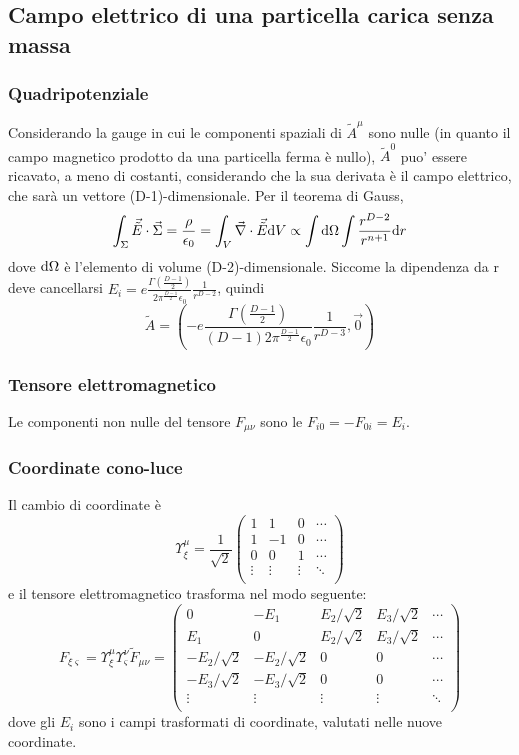 \subsection{ Campo elettrico di una particella carica senza massa}
\subsubsection{Quadripotenziale}
Considerando la gauge in cui le componenti spaziali di $\tilde{A}^\mu$ sono nulle (in quanto il campo magnetico prodotto da una particella ferma \`e nullo), $\tilde{A}^0$ puo' essere ricavato, a meno di costanti, considerando che la sua derivata \`e il campo elettrico, che sar\`a un vettore (D-1)-dimensionale. Per il teorema di Gauss,
\[ \int_\Sigma \vec{\tilde{E}}\cdot\vec{\Sigma} = \frac{\rho}{\epsilon_0} = \int_V \vec{\nabla}\cdot\vec{\tilde{E}} \mathrm{d} V \propto \int\mathrm{d}\Omega \int \frac{r^{D-2}}{r^{n+1}} \mathrm{d} r \]
dove $\mathrm{d}\Omega$ \`e l'elemento di volume (D-2)-dimensionale. Siccome la dipendenza da r deve cancellarsi \( E_i = e\frac{\Gamma(\frac{D-1}{2})}{2\pi^{\frac{D-1}{2}}\epsilon_0} \frac{1}{r^{D-2}} \), quindi
\[ \tilde{A} = (-e\frac{\Gamma(\frac{D-1}{2})}{(D-1)2\pi^{\frac{D-1}{2}}\epsilon_0} \frac{1}{r^{D-3}},\vec{0}) \]
\subsubsection{Tensore elettromagnetico}
Le componenti non nulle del tensore $F_{\mu\nu}$ sono le $F_{i0}=-F_{0i}=E_i$.

\subsubsection{Coordinate cono-luce}
Il cambio di coordinate \`e
\[ \Upsilon_\xi^\mu = 
\frac{1}{\sqrt{2}}
\begin{pmatrix}
	1 &  1 & 0 &\cdots  \\
	1 & -1 & 0 & \cdots  \\       
	0 &  0 & 1 & \cdots \\
	\vdots  & \vdots  & \vdots & \ddots \\
\end{pmatrix} 
\]
 e il tensore elettromagnetico trasforma nel modo seguente:
\[ F_{\xi\varsigma} = \Upsilon_\xi^\mu \Upsilon_\varsigma^\nu \tilde{F}_{\mu\nu} = 
\begin{pmatrix} 
	0             &  -E_1         & E_2/\sqrt{2}   & E_3/\sqrt{2} & \cdots \\
	E_1           &  0            & E_2/\sqrt{2}   & E_3/\sqrt{2} & \cdots \\       
	-E_2/\sqrt{2} & -E_2/\sqrt{2} & 0              & 0            & \cdots \\
	-E_3/\sqrt{2} & -E_3/\sqrt{2} & 0              & 0            & \cdots \\
	\vdots        & \vdots        & \vdots         & \vdots       & \ddots \\
\end{pmatrix}
\]
dove gli $E_i$ sono i campi trasformati di coordinate, valutati nelle nuove coordinate. 

